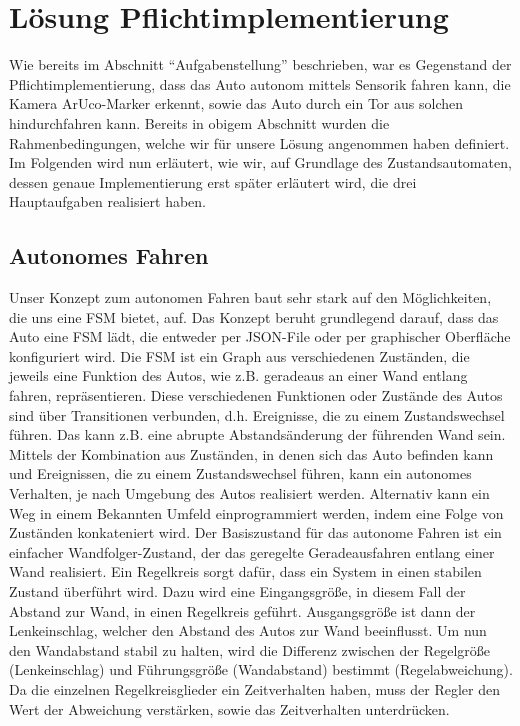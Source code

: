 \section{L\"osung Pflichtimplementierung}
\label{sec:lsgpflicht}

Wie bereits im Abschnitt "`Aufgabenstellung"' beschrieben, war es Gegenstand der Pflichtimplementierung, dass das Auto autonom mittels Sensorik fahren kann, die Kamera ArUco-Marker erkennt, sowie das Auto durch ein Tor aus solchen hindurchfahren kann. Bereits in obigem Abschnitt wurden die Rahmenbedingungen, welche wir für unsere Lösung angenommen haben definiert. Im Folgenden wird nun erläutert, wie wir, auf Grundlage des Zustandsautomaten, dessen genaue Implementierung erst später erläutert wird, die drei Hauptaufgaben realisiert haben.

\subsection{Autonomes Fahren}
Unser Konzept zum autonomen Fahren baut sehr stark auf den Möglichkeiten, die uns eine FSM bietet, auf. 
Das Konzept beruht grundlegend darauf, dass das Auto eine FSM lädt, die entweder per JSON-File oder per graphischer Oberfläche konfiguriert wird. Die FSM ist ein Graph aus verschiedenen Zuständen, die jeweils eine Funktion des Autos, wie z.B. geradeaus an einer Wand entlang fahren, repräsentieren. Diese verschiedenen Funktionen oder Zustände des Autos sind über Transitionen verbunden, d.h. Ereignisse, die zu einem Zustandswechsel führen. Das kann z.B. eine abrupte Abstandsänderung der führenden Wand sein.
\newline 
Mittels der Kombination aus Zuständen, in denen sich das Auto befinden kann und Ereignissen, die zu einem Zustandswechsel führen, kann ein autonomes Verhalten, je nach Umgebung des Autos realisiert werden. Alternativ kann ein Weg in einem Bekannten Umfeld einprogrammiert werden, indem eine Folge von Zuständen konkateniert wird. 
Der Basiszustand für das autonome Fahren ist ein einfacher Wandfolger-Zustand, der das geregelte Geradeausfahren entlang einer Wand realisiert. 
\newline
\newline
Ein Regelkreis sorgt dafür, dass ein System in einen stabilen Zustand überführt wird. Dazu wird eine Eingangsgröße, in diesem Fall der Abstand zur Wand, in einen Regelkreis geführt. Ausgangsgröße ist dann der Lenkeinschlag, welcher den Abstand des Autos zur Wand beeinflusst. Um nun den Wandabstand stabil zu halten, wird die Differenz zwischen der Regelgröße (Lenkeinschlag) und Führungsgröße (Wandabstand) bestimmt (Regelabweichung). Da die einzelnen Regelkreisglieder ein Zeitverhalten haben, muss der Regler den Wert der Abweichung verstärken, sowie das Zeitverhalten unterdrücken. 
